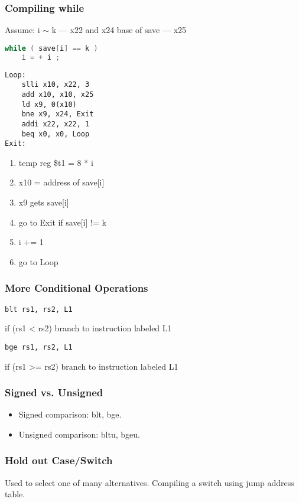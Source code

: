 \subsubsection{Compiling while}
Assume: i $\sim$ k --- x22 and x24 base of save --- x25
\begin{lstlisting}[language={c},title={C code}]
while ( save[i] == k )
    i = + i ;
\end{lstlisting}

\begin{lstlisting}[language={[x86masm]Assembler},title={RISCV assembly code}]
Loop: 
    slli x10, x22, 3
    add x10, x10, x25 
    ld x9, 0(x10)     
    bne x9, x24, Exit 
    addi x22, x22, 1
    beq x0, x0, Loop
Exit:
\end{lstlisting}
\begin{enumerate}
    \item  temp reg \$t1 = 8 * i
    \item x10 = address of save[i]
    \item x9 gets save[i]
    \item go to Exit if save[i] != k
    \item i += 1
    \item go to Loop
\end{enumerate}

\subsubsection{More Conditional Operations}
\begin{lstlisting}[language={[x86masm]Assembler}]
blt rs1, rs2, L1
\end{lstlisting}
if (rs1 < rs2) branch to instruction labeled L1
\begin{lstlisting}[language={[x86masm]Assembler}]
bge rs1, rs2, L1
\end{lstlisting}
if (rs1 >= rs2) branch to instruction labeled L1

\subsubsection{Signed vs. Unsigned}
\begin{itemize}
    \item\small Signed comparison: blt, bge. 
    \item\small Unsigned comparison: bltu, bgeu. 
\end{itemize}

\subsubsection{Hold out Case/Switch}
Used to select one of many alternatives. Compiling a switch using jump address table. 

